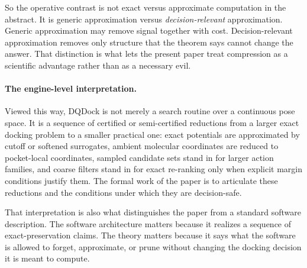So the operative contrast is not exact versus approximate computation in the abstract. It is generic approximation versus \emph{decision-relevant} approximation. Generic approximation may remove signal together with cost. Decision-relevant approximation removes only structure that the theorem says cannot change the answer. That distinction is what lets the present paper treat compression as a scientific advantage rather than as a necessary evil.

\paragraph{The engine-level interpretation.}
Viewed this way, DQDock is not merely a search routine over a continuous pose space. It is a sequence of certified or semi-certified reductions from a larger exact docking problem to a smaller practical one: exact potentials are approximated by cutoff or softened surrogates, ambient molecular coordinates are reduced to pocket-local coordinates, sampled candidate sets stand in for larger action families, and coarse filters stand in for exact re-ranking only when explicit margin conditions justify them. The formal work of the paper is to articulate these reductions and the conditions under which they are decision-safe.

That interpretation is also what distinguishes the paper from a standard software description. The software architecture matters because it realizes a sequence of exact-preservation claims. The theory matters because it says what the software is allowed to forget, approximate, or prune without changing the docking decision it is meant to compute.

